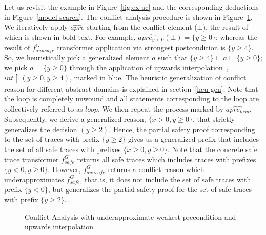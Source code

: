 \begin{example}
  Let us revisit the example in Figure~\ref{fig:ex-ac} and the corresponding
  deductions in Figure~\ref{model-search}. The conflict analysis procedure is
  shown in Figure~\ref{conflict-example}.  We iteratively apply $\widehat{apre}$ 
  starting from the conflict element ($\bot$), the result of which is shown in
  bold text.  For example, $\widehat{apre_{y < 0}}(\bot)= \{y \geq 0\}$; whereas the
  result of $f_{aunsafe}^{G}$ transformer application via strongest postcondition 
  is $\{y\geq 4\}$.  So, we heuristically pick a generalized element $a$ such 
  that $\{y\geq 4\} \sqsubseteq a \sqsubseteq \{y \geq 0\}$; we pick $a=\{y \geq 0\}$ 
  through the application of upwards interpolation~\cite{leo-thesis},  
  $int\upharpoonright(y \geq 0, y \geq 4)$, marked in blue.  The heuristic 
  generalization of conflict reason for different abstract domains is explained 
  in section~\ref{heu-gen}.
  Note that the loop is completely unwound and all statements corresponding to the 
  loop are collectively referred to as $loop$.
  We then repeat the process marked by $\widehat{apre_{loop}}$. Subsequently, we derive 
  a generalized reason, $\{x>0, y \geq 0\}$, that strictly generalizes the decision 
  $(y \geq 2)$.  Hence, the partial safety proof corresponding to the set of traces 
  with prefix $\{y \geq 2\}$ gives us a generalized prefix that 
  includes the set of all safe traces with prefixes $\{x \geq 0, y \geq 0\}$. 
  Note that the concrete safe trace transformer $f_{safe}^G$ returns all safe traces which 
  includes traces with prefixes $\{ y < 0, y \geq 0 \}$.  However, $f_{aunsafe}^G$ returns 
  a conflict reason which underapproximates $f_{safe}^G$, that is, it does not include 
  the set of safe traces with prefix $\{y<0\}$, but generalizes the partial safety proof 
	for the set of safe traces with prefix $\{y \geq 2\}$. .
\end{example}
%
\begin{figure}[t]
\centering
\vspace*{-0.2cm}
  \caption{Conflict Analysis with underapproximate weakest precondition and
  upwards interpolation}
\label{conflict-example}
\end{figure}
%
